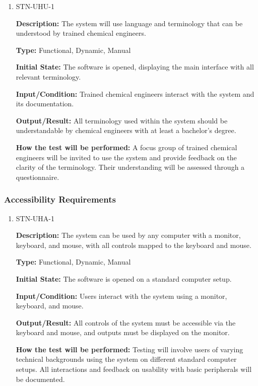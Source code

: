 \documentclass[12pt, titlepage]{article}
\begin{document}
\begin{enumerate}

\item{STN-UHU-1\\}

\textbf{Description:} The system will use language and terminology that can be understood by trained chemical engineers.

\textbf{Type:} Functional, Dynamic, Manual

\textbf{Initial State:} The software is opened, displaying the main interface with all relevant terminology.

\textbf{Input/Condition:} Trained chemical engineers interact with the system and its documentation.

\textbf{Output/Result:} All terminology used within the system should be understandable by chemical engineers with at least a bachelor’s degree.

\textbf{How the test will be performed:} A focus group of trained chemical engineers will be invited to use the system and provide feedback on the clarity of the terminology. Their understanding will be assessed through a questionnaire.

\end{enumerate}

\subsubsection{Accessibility Requirements}

\begin{enumerate}

\item{STN-UHA-1\\}

\textbf{Description:} The system can be used by any computer with a monitor, keyboard, and mouse, with all controls mapped to the keyboard and mouse.

\textbf{Type:} Functional, Dynamic, Manual

\textbf{Initial State:} The software is opened on a standard computer setup.

\textbf{Input/Condition:} Users interact with the system using a monitor, keyboard, and mouse.

\textbf{Output/Result:} All controls of the system must be accessible via the keyboard and mouse, and outputs must be displayed on the monitor.

\textbf{How the test will be performed:} Testing will involve users of varying technical backgrounds using the system on different standard computer setups. All interactions and feedback on usability with basic peripherals will be documented.

\end{enumerate}
\end{document}
